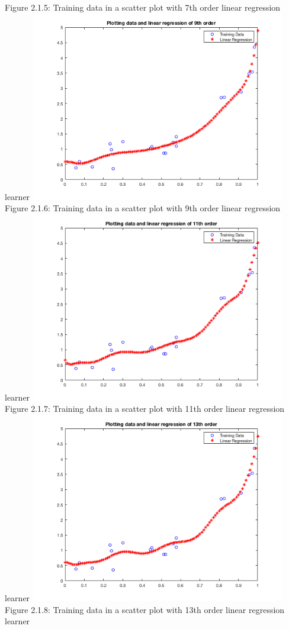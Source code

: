 \documentclass[]{scrreprt}   %
\begin{document}
\begin{center}
	{Figure 2.1.5: Training data in a scatter plot with 7th order linear regression learner}
	\includegraphics[width=30em,keepaspectratio]{p1figure6.png}\\
	{Figure 2.1.6: Training data in a scatter plot with 9th order linear regression learner}
	\includegraphics[width=30em,keepaspectratio]{p1figure7.png}\\
	{Figure 2.1.7: Training data in a scatter plot with 11th order linear regression learner}
	\includegraphics[width=30em,keepaspectratio]{p1figure8.png}\\
	{Figure 2.1.8: Training data in a scatter plot with 13th order linear regression learner}
\end{center} 
\end{document}
